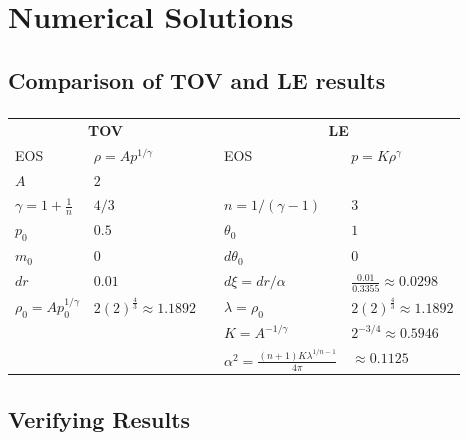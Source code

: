 \section{Numerical Solutions}

\subsection{Comparison of TOV and LE results}

\begin{frame}
	\frametitle{\insertsubsection}
	\begin{table}[H]
		\renewcommand{\arraystretch}{1.2}
		\centering
		\begin{tabular}{@{}llcll@{}}
			\toprule
			\multicolumn{2}{c}{\textbf{TOV}} & \phantom{b} &\multicolumn{2}{c}{\textbf{LE}}\\
			\cmidrule{1-2} \cmidrule{4-5}
			EOS & $\rho=Ap^{1/\gamma}$ && EOS & $p=K\rho^{\gamma}$\\
			$A$ & $2$ & & \\
			$\gamma=1+\frac{1}{n}$ & $4/3$ && $n=1/(\gamma-1)$ & $3$\\
			$p_0$ & $0.5$ && $\theta_0$ & $1$\\
			$m_0$ & $0$ && $d\theta_0$ & $0$\\
			$dr$ & $0.01$ && $d\xi=dr/\alpha$ & $\frac{0.01}{0.3355}\approx0.0298$\\
			\cmidrule{1-2} \cmidrule{4-5}
			$\rho_0=Ap_0^{1/\gamma}$ & $2(2)^{\frac{4}{3}}\approx1.1892$ && $\lambda=\rho_0$ & $2(2)^{\frac{4}{3}}\approx1.1892$\\
			&&& $K=A^{-1/\gamma}$ & $2^{-3/4}\approx0.5946$\\
			&&& $\alpha^2=\frac{(n+1)K\lambda^{1/n-1}}{4\pi}$ & $\approx0.1125$\\
			\bottomrule
		\end{tabular}
	\end{table}%
\end{frame}



\begin{frame}
	\begin{figure}
		\centering
	\end{figure}
\end{frame}

\subsection{Verifying Results}
\begin{frame}
	\frametitle{\insertsubsection}
	\begin{figure}
		\centering
	\end{figure}
\end{frame}


